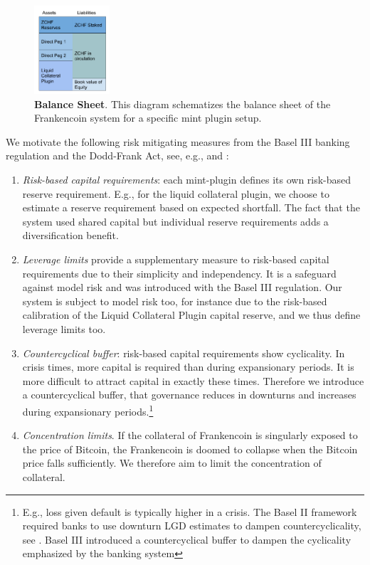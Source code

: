 \documentclass[english,11pt]{article}
\begin{document}
\begin{figure}[h]
    \center
    \includegraphics[width=0.25\textwidth]{FCBalanceSheet.pdf}
    \caption{\textbf{Balance Sheet}. This diagram
    schematizes the balance sheet of the Frankencoin system for
    a specific mint plugin setup.}\label{fig:bs}
\end{figure}

We motivate the following risk mitigating measures from 
the Basel III banking regulation and the Dodd-Frank Act, see, e.g., \cite{basel3}
and \cite{acharya2010regulating}:
\begin{enumerate}
\item \emph{Risk-based capital requirements}: each mint-plugin defines its own
	risk-based reserve requirement. E.g., for the liquid collateral
	plugin, we choose to estimate a reserve requirement based on expected shortfall.
	The fact that the system used shared capital but individual reserve requirements
	adds a diversification benefit.
\item \emph{Leverage limits} provide a supplementary measure to
	risk-based capital requirements due to their simplicity and independency. 
	It is a safeguard against model risk and was introduced with the
	Basel III regulation. Our system is subject to model risk too, for instance
	due to the risk-based calibration of the Liquid Collateral Plugin capital
	reserve, and we thus define leverage limits too.
\item \emph{Countercyclical buffer}: risk-based capital requirements
	show cyclicality. In crisis times, more capital is required
	than during expansionary periods. It is more difficult to
	attract capital in exactly these times. Therefore we
	introduce a countercyclical buffer, that governance reduces
	in downturns and increases during expansionary periods.\footnote{E.g., 
	loss given default is typically higher
	in a crisis. The Basel II framework required banks to use downturn LGD
	estimates to dampen countercyclicality, see \cite{engelmann2006basel}.
	Basel III introduced a countercyclical buffer to dampen the cyclicality
	emphasized by the banking system}
\item \emph{Concentration limits}. If the collateral of Frankencoin
	is singularly exposed to the price of Bitcoin, the Frankencoin is doomed
	to collapse when the Bitcoin price falls sufficiently. We therefore aim
	to limit the concentration of collateral. 
\end{enumerate}
\end{document}

